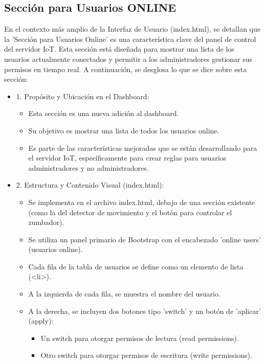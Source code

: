 \documentclass{report}
\begin{document}
\subsection{Sección para Usuarios ONLINE}
En el contexto más amplio de la Interfaz de Usuario (index.html), se  detallan que la 'Sección para Usuarios Online' es una 
característica clave del panel de control del servidor IoT. Esta sección está diseñada para mostrar una lista de los usuarios actualmente 
conectados y permitir a los administradores gestionar sus permisos en tiempo real.
A continuación, se desglosa lo que se  dice sobre esta sección:
\begin{itemize}
    \item 1. Propósito y Ubicación en el Dashboard:
        \begin{itemize}
            \item Esta sección es una nueva adición al dashboard.
            \item Su objetivo es mostrar una lista de todos los usuarios online.
            \item Es parte de las características mejoradas que se están desarrollando para el servidor IoT, específicamente para crear reglas para 
            usuarios administradores y no administradores.
        \end{itemize}
    \item 2. Estructura y Contenido Visual (index.html):
        \begin{itemize}
            \item Se implementa en el archivo index.html, debajo de una sección existente (como la del detector de movimiento y el botón para 
            controlar el zumbador).
            \item Se utiliza un panel primario de Bootstrap con el encabezado 'online users' (usuarios online).
            \item Cada fila de la tabla de usuarios se define como un elemento de lista (<li>).
            \item A la izquierda de cada fila, se muestra el nombre del usuario.
            \item A la derecha, se incluyen dos botones tipo 'switch' y un botón de 'aplicar' (apply):
                \begin{itemize}
                    \item Un switch para otorgar permisos de lectura (read permissions).
                    \item Otro switch para otorgar permisos de escritura (write permissions).

\end{itemize}
\end{itemize}
\end{itemize}
\end{document}
